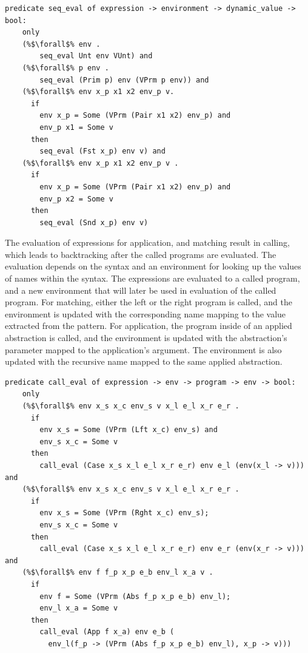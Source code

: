 \documentclass{article}
\begin{document}
\begin{lstlisting}[language=logic, escapechar=\%]
  predicate seq_eval of expression -> environment -> dynamic_value -> bool:
    only
    (%$\forall$% env . 
        seq_eval Unt env VUnt) and
    (%$\forall$% p env .
        seq_eval (Prim p) env (VPrm p env)) and
    (%$\forall$% env x_p x1 x2 env_p v. 
      if
        env x_p = Some (VPrm (Pair x1 x2) env_p) and
        env_p x1 = Some v
      then
        seq_eval (Fst x_p) env v) and
    (%$\forall$% env x_p x1 x2 env_p v . 
      if
        env x_p = Some (VPrm (Pair x1 x2) env_p) and 
        env_p x2 = Some v 
      then
        seq_eval (Snd x_p) env v)
  \end{lstlisting}

The evaluation of expressions for application, and matching result in calling, which leads to
backtracking after the called programs are evaluated. The evaluation depends on the syntax
and an environment for looking up the values of names within the syntax.
The expressions are evaluated to a called program, and a new environment that will
later be used in evaluation of the called program. For matching, either the left or the right
program is called, and the environment is updated with the corresponding name mapping to the
value extracted from the pattern. For application, the program inside of an applied abstraction
is called, and the environment is updated with the abstraction's parameter mapped to the
application's argument. The environment is also updated with the recursive name mapped to the
same applied abstraction.

\begin{lstlisting}[language=logic, escapechar=\%]
  predicate call_eval of expression -> env -> program -> env -> bool:
    only
    (%$\forall$% env x_s x_c env_s v x_l e_l x_r e_r .
      if
        env x_s = Some (VPrm (Lft x_c) env_s) and
        env_s x_c = Some v
      then
        call_eval (Case x_s x_l e_l x_r e_r) env e_l (env(x_l -> v))) and
    (%$\forall$% env x_s x_c env_s v x_l e_l x_r e_r .
      if 
        env x_s = Some (VPrm (Rght x_c) env_s); 
        env_s x_c = Some v
      then
        call_eval (Case x_s x_l e_l x_r e_r) env e_r (env(x_r -> v))) and
    (%$\forall$% env f f_p x_p e_b env_l x_a v .
      if 
        env f = Some (VPrm (Abs f_p x_p e_b) env_l); 
        env_l x_a = Some v
      then
        call_eval (App f x_a) env e_b (
          env_l(f_p -> (VPrm (Abs f_p x_p e_b) env_l), x_p -> v)))
  \end{lstlisting}
  
\end{document}
